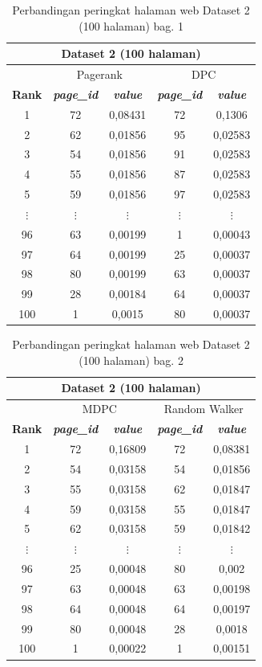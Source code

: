 \begin{longtable}{|c|c|c|c|c|}
	\caption{Perbandingan peringkat halaman web Dataset 2 (100 halaman) bag. 1}
	\label{table:rank_comparisson_dataset_2} \\
	\hline
	\multicolumn{5}{|c|}{Dataset 2 (100 halaman)} \\
	\hline
	& \multicolumn{2}{c|}{Pagerank} & \multicolumn{2}{c|}{DPC} \\
	\hline
	\textbf{Rank} & \textbf{\textit{page\_id}} & \textbf{\textit{value}} & \textbf{\textit{page\_id}} & \textbf{\textit{value}} \\
	1 & 72 & 0,08431 & 72 & 0,1306 \\
	2 & 62 & 0,01856 & 95 & 0,02583 \\
	3 & 54 & 0,01856 & 91 & 0,02583 \\
	4 & 55 & 0,01856 & 87 & 0,02583 \\
	5 & 59 & 0,01856 & 97 & 0,02583 \\
	$\vdots$ & $\vdots$ & $\vdots$ & $\vdots$ & $\vdots$ \\
	96 & 63 & 0,00199 & 1 & 0,00043 \\
	97 & 64 & 0,00199 & 25 & 0,00037 \\
	98 & 80 & 0,00199 & 63 & 0,00037 \\
	99 & 28 & 0,00184 & 64 & 0,00037 \\
	100 & 1 & 0,0015 & 80 & 0,00037 \\
	\hline
\end{longtable}

\begin{longtable}{|c|c|c|c|c|}
	\caption{Perbandingan peringkat halaman web Dataset 2 (100 halaman) bag. 2}
	\label{table:rank_comparisson_dataset_2} \\
	\hline
	\multicolumn{5}{|c|}{Dataset 2 (100 halaman)} \\
	\hline
	& \multicolumn{2}{c|}{MDPC} & \multicolumn{2}{c|}{Random Walker} \\
	\hline
	\textbf{Rank} & \textbf{\textit{page\_id}} & \textbf{\textit{value}} & \textbf{\textit{page\_id}} & \textbf{\textit{value}} \\
	\hline
	1 & 72 & 0,16809 & 72 & 0,08381 \\
	2 & 54 & 0,03158 & 54 & 0,01856 \\
	3 & 55 & 0,03158 & 62 & 0,01847 \\
	4 & 59 & 0,03158 & 55 & 0,01847 \\
	5 & 62 & 0,03158 & 59 & 0,01842 \\
	$\vdots$ & $\vdots$ & $\vdots$ & $\vdots$ & $\vdots$ \\
	96 & 25 & 0,00048 & 80 & 0,002 \\
	97 & 63 & 0,00048 & 63 & 0,00198 \\
	98 & 64 & 0,00048 & 64 & 0,00197 \\
	99 & 80 & 0,00048 & 28 & 0,0018 \\
	100 & 1 & 0,00022 & 1 & 0,00151 \\
	\hline
\end{longtable}

